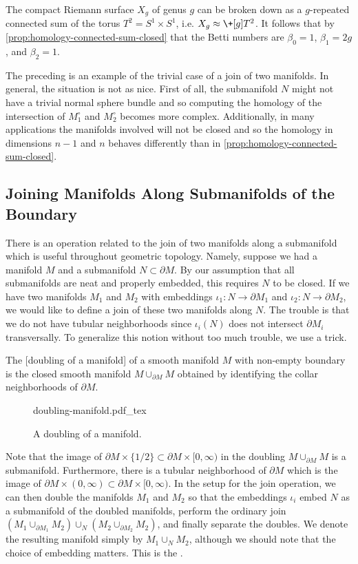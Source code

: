 \begin{example}
	The compact Riemann surface $X_g$ of genus $g$ can be broken down as a $g$-repeated connected sum of the torus $T^2=S^1\times S^1$, i.e. $X_g \cong \+[g] T^2$. It follows that by \cref{prop:homology-connected-sum-closed} that the Betti numbers are $\beta_0=1$, $\beta_1=2g$, and $\beta_2=1$.
\end{example}

The preceding is an example of the trivial case of a join of two manifolds. In general, the situation is not as nice. First of all, the submanifold $N$ might not have a trivial normal sphere bundle and so computing the homology of the intersection of $M_1^\circ$ and $M_2^\circ$ becomes more complex. Additionally, in many applications the manifolds involved will not be closed and so the homology in dimensions $n-1$ and $n$ behaves differently than in \cref{prop:homology-connected-sum-closed}.

\subsection{Joining Manifolds Along Submanifolds of the Boundary}

There is an operation related to the join of two manifolds along a submanifold which is useful throughout geometric topology. Namely, suppose we had a manifold $M$ and a submanifold $N\subset \partial M$. By our assumption that all submanifolds are neat and properly embedded, this requires $N$ to be closed. If we have two manifolds $M_1$ and $M_2$ with embeddings $\iota_1 : N \to \partial M_1$ and $\iota_2 : N \to \partial M_2$, we would like to define a join of these two manifolds along $N$. The trouble is that we do not have tubular neighborhoods since $\iota_i(N)$ does not intersect $\partial M_i$ transversally. To generalize this notion without too much trouble, we use a trick.

\begin{definition}
	The [doubling of a manifold] of a smooth manifold $M$ with non-empty boundary is the closed smooth manifold $M\cup_{\partial M} M$ obtained by identifying the collar neighborhoods of $\partial M$.
\end{definition}
\begin{figure}[ht]
	\centering
	{doubling-manifold.pdf_tex}
	\caption{A doubling of a manifold.}
\end{figure}
Note that the image of $\partial M\times \{1/2\}\subset \partial M\times[0,\infty)$ in the doubling $M\cup_{\partial M} M$ is a submanifold. Furthermore, there is a tubular neighborhood of $\partial M$ which is the image of $\partial M\times (0,\infty)\subset \partial M\times [0,\infty)$.
In the setup for the join operation, we can then double the manifolds $M_1$ and $M_2$ so that the embeddings $\iota_i$ embed $N$ as a submanifold of the doubled manifolds, perform the ordinary join $(M_1\cup_{\partial M_1} M_2)\cup_N (M_2\cup_{\partial M_2} M_2)$, and finally separate the doubles. We denote the resulting manifold simply by $M_1\cup_N M_2$, although we should note that the choice of embedding matters. This is the .

